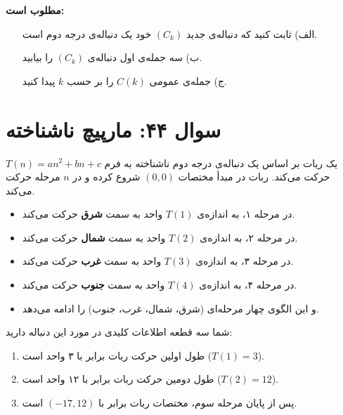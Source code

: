 \documentclass[12pt]{article}
\begin{document}
	\textbf{مطلوب است:}
	\begin{itemize}
		\item[الف)] ثابت کنید که دنباله‌ی جدید \( (C_k) \) خود یک دنباله‌ی درجه دوم است.
		\item[ب)] سه جمله‌ی اول دنباله‌ی \( (C_k) \) را بیابید.
		\item[ج)] جمله‌ی عمومی \( C(k) \) را بر حسب \(k\) پیدا کنید.
	\end{itemize}
	
	\vspace{1cm}
	
	\vspace{1cm}
	
	\section*{سوال ۴۴: مارپیچ ناشناخته }
	یک ربات بر اساس یک دنباله‌ی درجه دوم ناشناخته به فرم \( T(n) = an^2 + bn + c \) حرکت می‌کند. ربات در مبدأ مختصات \( (0,0) \) شروع کرده و در \(n\) مرحله حرکت می‌کند.
	\begin{itemize}
		\item در مرحله ۱، به اندازه‌ی \(T(1)\) واحد به سمت \textbf{شرق} حرکت می‌کند.
		\item در مرحله ۲، به اندازه‌ی \(T(2)\) واحد به سمت \textbf{شمال} حرکت می‌کند.
		\item در مرحله ۳، به اندازه‌ی \(T(3)\) واحد به سمت \textbf{غرب} حرکت می‌کند.
		\item در مرحله ۴، به اندازه‌ی \(T(4)\) واحد به سمت \textbf{جنوب} حرکت می‌کند.
		\item و این الگوی چهار مرحله‌ای (شرق، شمال، غرب، جنوب) را ادامه می‌دهد.
	\end{itemize}
	\vspace{0.5cm}
	
	شما سه قطعه اطلاعات کلیدی در مورد این دنباله دارید:
	\begin{enumerate}[label=(\roman*)]
		\item طول اولین حرکت ربات برابر با ۳ واحد است (\(T(1) = 3\)).
		\item طول دومین حرکت ربات برابر با ۱۲ واحد است (\(T(2) = 12\)).
		\item پس از پایان مرحله سوم، مختصات ربات برابر با \( (-17, 12) \) است.
	\end{enumerate}
	\vspace{0.5cm}
	
\end{document}
